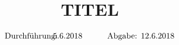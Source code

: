 

\subject{VERSUCH NUMMER}
\title{TITEL}

\date{
  \begin{align}
    &\text{Durchführung: } & \hspace{-2em} \text{5.6.2018} & \hspace{2em} & \text{Abgabe: 12.6.2018} \notag
  \end{align}
}




\maketitle
\thispagestyle{empty}
\tableofcontents
\newpage






\nocite{*}
\printbibliography{}


